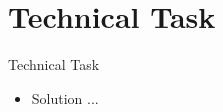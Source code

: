 \section{Technical Task}
\begin{frame}{Technical Task}
%
  \begin{itemize}\itemfill
    \item Solution ...
  \end{itemize}
%
\end{frame}

